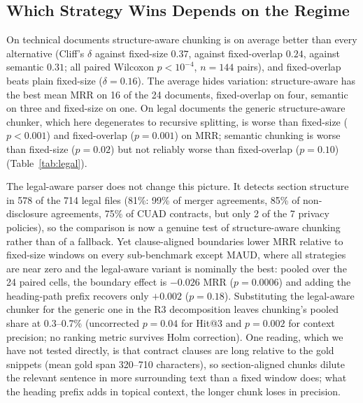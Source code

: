 \documentclass[runningheads]{llncs}
\begin{document}
\subsection{Which Strategy Wins Depends on the Regime}
\label{sec:pairwise}
On technical documents structure-aware chunking is on average better than every alternative (Cliff's $\delta$ against fixed-size $0.37$, against fixed-overlap $0.24$, against semantic $0.31$; all paired Wilcoxon $p<10^{-4}$, $n=144$ pairs), and fixed-overlap beats plain fixed-size ($\delta=0.16$). The average hides variation: structure-aware has the best mean MRR on 16 of the 24 documents, fixed-overlap on four, semantic on three and fixed-size on one. On legal documents the generic structure-aware chunker, which here degenerates to recursive splitting, is worse than fixed-size ($p<0.001$) and fixed-overlap ($p=0.001$) on MRR; semantic chunking is worse than fixed-size ($p=0.02$) but not reliably worse than fixed-overlap ($p=0.10$) (Table~\ref{tab:legal}).

The legal-aware parser does not change this picture. It detects section structure in 578 of the 714 legal files (81\%: 99\% of merger agreements, 85\% of non-disclosure agreements, 75\% of CUAD contracts, but only 2 of the 7 privacy policies), so the comparison is now a genuine test of structure-aware chunking rather than of a fallback. Yet clause-aligned boundaries lower MRR relative to fixed-size windows on every sub-benchmark except MAUD, where all strategies are near zero and the legal-aware variant is nominally the best: pooled over the 24 paired cells, the boundary effect is $-0.026$ MRR ($p=0.0006$) and adding the heading-path prefix recovers only $+0.002$ ($p=0.18$). Substituting the legal-aware chunker for the generic one in the R3 decomposition leaves chunking's pooled share at 0.3--0.7\% (uncorrected $p=0.04$ for Hit@3 and $p=0.002$ for context precision; no ranking metric survives Holm correction). One reading, which we have not tested directly, is that contract clauses are long relative to the gold snippets (mean gold span 320--710 characters), so section-aligned chunks dilute the relevant sentence in more surrounding text than a fixed window does; what the heading prefix adds in topical context, the longer chunk loses in precision.
\end{document}
